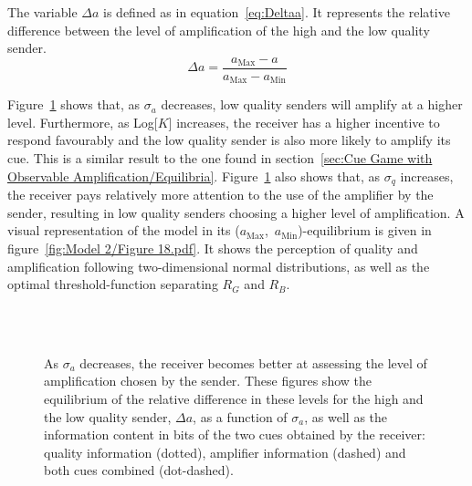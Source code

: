 \documentclass[a4paper,12pt]{article}
\numberwithin{equation}{section}
\begin{document}
The variable $\Delta a$ is defined as in equation~\ref{eq:Deltaa}. It represents the relative difference between the level of amplification of the high and the low quality sender.
\begin{equation}
\label{eq:Deltaa}
\Delta a = \frac{a_{\text{Max}}-a}{a_{\text{Max}}-a_{\text{Min}}}
\end{equation}

Figure~\ref{fig:Model 2/Figure 1314151617} shows that, as $\sigma_{a}$ decreases, low quality senders will amplify at a higher level. Furthermore, as Log[$K$] increases, the receiver has a higher incentive to respond favourably and the low quality sender is also more likely to amplify its cue. This is a similar result to the one found in section~\ref{sec:Cue Game with Observable Amplification/Equilibria}. Figure~\ref{fig:Model 2/Figure 1314151617} also shows that, as $\sigma_{q}$ increases, the receiver pays relatively more attention to the use of the amplifier by the sender, resulting in low quality senders choosing a higher level of amplification. A visual representation of the model in its ($a_{\text{Max}}$,~$a_{\text{Min}}$)-equilibrium is given in figure~\ref{fig:Model 2/Figure 18.pdf}. It shows the perception of quality and amplification following two-dimensional normal distributions, as well as the optimal threshold-function separating $R_{G}$ and $R_{B}$.
\begin{figure}[!h]
\hfill
{}\\[-3mm]
\hfill
{}\\[-3mm]
\hfill
\begin{minipage}[t]{.45\textwidth}
\captionsetup{width=250pt}
\vspace{-45mm}
\caption{As $\sigma_{a}$ decreases, the receiver becomes better at assessing the level of amplification chosen by the sender. These figures show the equilibrium of the relative difference in these levels for the high and the low quality sender, $\Delta a$, as a function of $\sigma_{a}$, as well as the information content in bits of the two cues obtained by the receiver: quality information (dotted), amplifier information (dashed) and both cues combined (dot-dashed).}
\label{fig:Model 2/Figure 1314151617}
\end{minipage}
\end{figure}
\end{document}

